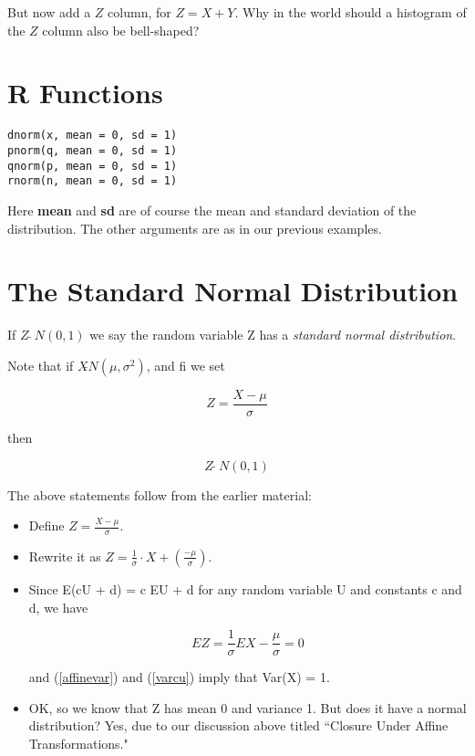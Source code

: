 But now add a $Z$ column, for $Z = X + Y$.  Why in the world should a
histogram of the $Z$ column also be bell-shaped?

\section{R Functions}

\begin{lstlisting}
dnorm(x, mean = 0, sd = 1)
pnorm(q, mean = 0, sd = 1)
qnorm(p, mean = 0, sd = 1)
rnorm(n, mean = 0, sd = 1)
\end{lstlisting}

Here {\bf mean} and {\bf sd} are of course the mean and standard
deviation of the distribution.  The other arguments are as in our
previous examples.

\section{The Standard Normal Distribution}
\label{stdnorm}

\begin{definition}

If $Z ~ \widetilde{} ~ N(0,1)$ we say the random variable Z has a {\it
standard normal distribution}.

Note that if $X \widetilde{} N(\mu,\sigma^2)$, and fi we set

\begin{equation}
Z = \frac{X - \mu}{\sigma}
\end{equation}

then 

\begin{equation}
\label{zisn01}
Z ~ \widetilde{} ~ N(0,1)
\end{equation}

\end{definition}

The above statements follow from the earlier material:

\begin{itemize}

\item Define $Z = \frac{X - \mu}{\sigma}$.

\item Rewrite it as $Z = \frac{1}{\sigma} \cdot X +
(\frac{-\mu}{\sigma})$.

\item Since E(cU + d) = c EU + d for any random variable U and constants
c and d, we have

\begin{equation}
EZ = \frac{1}{\sigma} EX - \frac{\mu}{\sigma} = 0
\end{equation}

and (\ref{affinevar}) and (\ref{varcu}) imply that Var(X) = 1.

\item OK, so we know that Z has mean 0 and variance 1.  But does it have
a normal distribution?  Yes, due to our discussion above titled
``Closure Under Affine Transformations."

\end{itemize}

